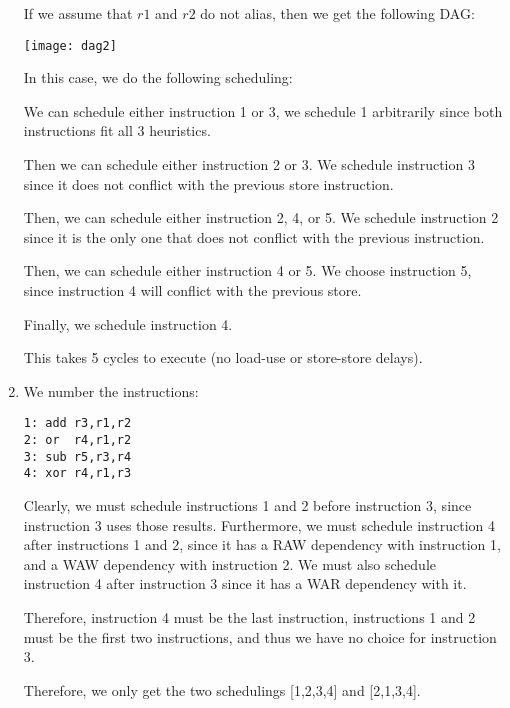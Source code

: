 \begin{enumerate}[label=(\alph*)]
If we assume that $r1$ and $r2$ do not alias, then we get the following DAG:

\texttt{[image: dag2]}

In this case, we do the following scheduling:

We can schedule either instruction 1 or 3, we schedule 1 arbitrarily since both instructions fit all 3 heuristics.

Then we can schedule either instruction 2 or 3. We schedule instruction 3 since it does not conflict with the previous store instruction.

Then, we can schedule either instruction 2, 4, or 5. We  schedule instruction 2 since it is the only one that does not conflict with the previous instruction.

Then, we can schedule either instruction 4 or 5. We choose instruction 5, since instruction 4 will conflict with the previous store.

Finally, we schedule instruction 4.

This takes 5 cycles to execute (no load-use or store-store delays).

\item
  We number the instructions:

\begin{verbatim}
1: add r3,r1,r2
2: or  r4,r1,r2
3: sub r5,r3,r4
4: xor r4,r1,r3
\end{verbatim}

Clearly, we must schedule instructions 1 and 2 before instruction 3, since instruction 3 uses those results. Furthermore, we must schedule instruction 4 after instructions 1 and 2, since it has a RAW dependency with instruction 1, and a WAW dependency with instruction 2. We must also schedule instruction 4 after instruction 3 since it has a WAR dependency with it.

Therefore, instruction 4 must be the last instruction, instructions 1 and 2 must be the first two instructions, and thus we have no choice for instruction 3.

Therefore, we only get the two schedulings [1,2,3,4] and [2,1,3,4].

  
        
    \end{enumerate}

